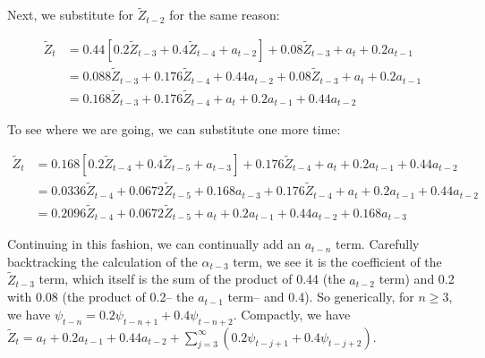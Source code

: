 \documentclass[12pt, letterpaper]{article}
\theoremstyle{definition}
\numberwithin{equation}{section}
\newcommand{\+}[1]{+_{\scalebox{.375}{#1}}}
\newcommand{\1}{\mathbbm{1}}
\begin{document}
Next, we substitute for $\tilde{Z}_{t-2}$ for the same reason:


\vspace{-0.5cm}
\begin{align*}
	\tilde{Z}_t&=0.44[0.2\tilde{Z}_{t-3}+0.4\tilde{Z}_{t-4}+a_{t-2}]+0.08\tilde{Z}_{t-3}+a_t+0.2a_{t-1}\\
	&=0.088\tilde{Z}_{t-3}+0.176\tilde{Z}_{t-4}+0.44a_{t-2}+0.08\tilde{Z}_{t-3}+a_t+0.2a_{t-1}\\
	&=0.168\tilde{Z}_{t-3}+0.176\tilde{Z}_{t-4}+a_t+0.2a_{t-1}+0.44a_{t-2}
\end{align*}

To see where we are going, we can substitute one more time:

\vspace{-0.5cm}
\begin{align*}
	\tilde{Z}_t&=0.168[0.2\tilde{Z}_{t-4}+0.4\tilde{Z}_{t-5}+a_{t-3}]+0.176\tilde{Z}_{t-4}+a_t+0.2a_{t-1}+0.44a_{t-2}\\
	&=0.0336\tilde{Z}_{t-4}+0.0672\tilde{Z}_{t-5}+0.168a_{t-3}+0.176\tilde{Z}_{t-4}+a_t+0.2a_{t-1}+0.44a_{t-2}\\
	&=0.2096\tilde{Z}_{t-4}+0.0672\tilde{Z}_{t-5}+a_t+0.2a_{t-1}+0.44a_{t-2}+0.168a_{t-3}
\end{align*}

Continuing in this fashion, we can continually add an $a_{t-n}$ term. Carefully backtracking the calculation of the $\alpha_{t-3}$ term, we see it is the coefficient of the $\tilde{Z}_{t-3}$ term, which itself  is the sum of the product of 0.44 (the $a_{t-2}$ term) and 0.2 with 0.08 (the product of 0.2-- the $a_{t-1}$ term-- and 0.4). So generically, for $n\geq 3$, we have $\psi_{t-n}=0.2\psi_{t-n+1}+0.4\psi_{t-n+2}$. Compactly, we have $\tilde{Z}_{t}=a_t+0.2a_{t-1}+0.44a_{t-2}+\sum\limits_{j=3}^{\infty}(0.2\psi_{t-j+1}+0.4\psi_{t-j+2})$. 











\newpage
\noindent\textbf{}
\vspace{\baselineskip}
\end{document}
